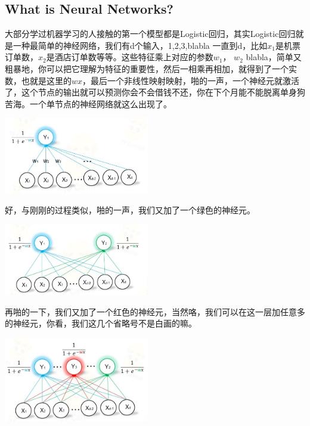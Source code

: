 \documentclass{article}
\begin{document}
\subsection{What is Neural Networks?}




大部分学过机器学习的人接触的第一个模型都是Logistic回归，其实Logistic回归就是一种最简单的神经网络，我们有d个输入，1,2,3,blabla 一直到d，比如$x_1$是机票订单数，$x_2$是酒店订单数等等。这些特征乘上对应的参数$w_1$， $w_2$ blabla，简单又粗暴地，你可以把它理解为特征的重要性，然后一相乘再相加，就得到了一个实数，也就是这里的$wx$，最后一个非线性映射映射，啪的一声，一个神经元就激活了，这个节点的输出就可以预测你会不会借钱不还，你在下个月能不能脱离单身狗苦海。一个单节点的神经网络就这么出现了。

\begin{center}
\includegraphics[width=2.5in]{image/image7.jpg}
\end{center}


好，与刚刚的过程类似，啪的一声，我们又加了一个绿色的神经元。
\begin{center}
\includegraphics[width=2.5in]{image/image8.jpg}
\end{center}


再啪的一下，我们又加了一个红色的神经元，当然咯，我们可以在这一层加任意多的神经元，你看，我们这几个省略号不是白画的嘛。

\begin{center}
\includegraphics[width=2.5in]{image/image9.jpg}
\end{center}
\end{document}
